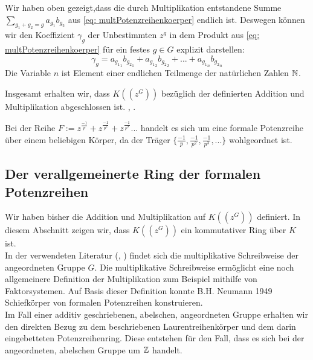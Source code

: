 {%
\begin{bem}
Wir haben oben gezeigt,dass die durch Multiplikation entstandene Summe $\sum_{g_1 + g_2 = g}^{}a_{g_1} b_{g_2}$ aus \ref{eq: multPotenzreihenkoerper} endlich ist. Deswegen können wir den Koeffizient $\gamma_g$ der Unbestimmten $z^g$ in dem Produkt aus \ref{eq: multPotenzreihenkoerper} für ein festes $g\in G$ explizit darstellen:
\[\gamma_g = a_{{g_1}_1}b_{{g_2}_1} + a_{{g_1}_2}b_{{g_2}_2} + ... + a_{{g_1}_n}b_{{g_2}_n}\]
Die Variable $n$ ist Element einer endlichen Teilmenge der natürlichen Zahlen $\mathbb{N}$.
\end{bem}
%
%
%
%
%
}

Insgesamt erhalten wir, dass $K\left(\left(z^{G}\right)\right)$ bezüglich der definierten Addition und Multiplikation abgeschlossen ist. \cite[Seite 601ff]{hahn07}, \cite[S. 210- 213]{neumann49}.
%
% 
%
\begin{bsp}
Bei der Reihe $F := z^{\frac{-1}{p}}+  z^{\frac{-1}{p^2}} + z^{\frac{-1}{p^3}} ...$ handelt es sich um eine formale Potenzreihe über einem beliebigen Körper, da der Träger $\lbrace \frac{-1}{p}, \frac{-1}{p^2}, \frac{-1}{p^3}, ... \rbrace$ wohlgeordnet ist.
\end{bsp}
%
%
%
%
%
%
%
%
\subsection{Der verallgemeinerte Ring der formalen Potenzreihen} 
Wir haben bisher die Addition und Multiplikation auf $K\left(\left(z^{G}\right)\right)$ definiert. In diesem Abschnitt zeigen wir, dass $K\left(\left(z^{G}\right)\right)$ ein kommutativer Ring über $K$ ist.\\
In der verwendeten Literatur (\cite{priesscrampe83}, \cite{fuchs66}) findet sich die multiplikative Schreibweise der angeordneten Gruppe $G$. Die multiplikative Schreibweise ermöglicht eine noch allgemeinere Definition der Multiplikation zum Beispiel mithilfe von Faktorsystemen. Auf Basis dieser Definition konnte B.H. Neumann 1949 Schiefkörper von formalen Potenzreihen konstruieren.  \\
Im Fall einer additiv geschriebenen, abelschen, angeordneten Gruppe erhalten wir den direkten Bezug zu dem beschriebenen Laurentreihenkörper und dem darin eingebetteten Potenzreihenring. Diese entstehen für den Fall, dass es sich bei der angeordneten, abelschen Gruppe um $\mathbb{Z}$ handelt. 

